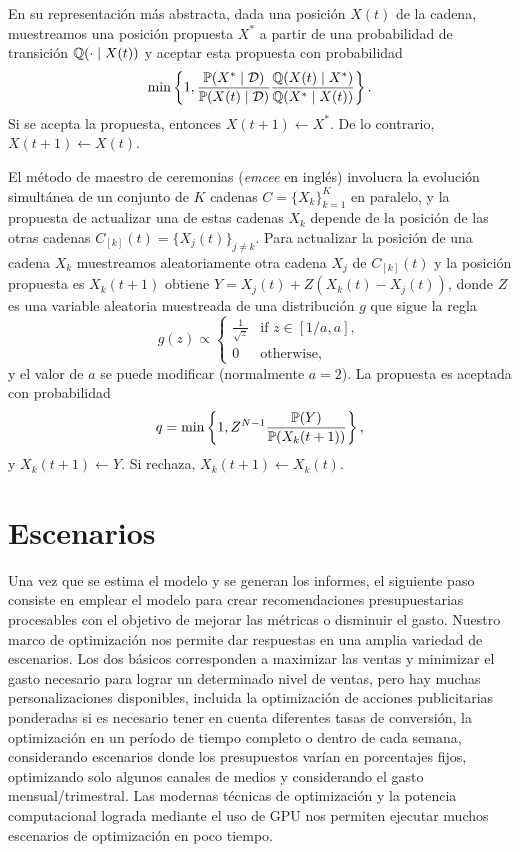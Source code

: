 En su representación más abstracta, dada una posición \(X(t)\) de la cadena, muestreamos una posición propuesta \(X^*\) a partir de una probabilidad de transición \(\mathbb{Q}(\cdot \mid X(t))\) y aceptar esta propuesta con probabilidad
\[ \min \left\{ 1, \frac{\mathbb{P}(X^* \mid \mathcal{D})}{\mathbb{P}(X(t) \mid \mathcal{D})} \frac{\mathbb{Q}(X(t) \mid X^* )}{\mathbb{Q}(X^* \mid X(t))} \right\}. \]
Si se acepta la propuesta, entonces \(X(t+1) \gets X^*\). De lo contrario, \(X(t+1) \gets X(t)\).

El método de maestro de ceremonias (\emph{emcee} en inglés) involucra la evolución simultánea de un conjunto de \(K\) cadenas \( C = \{X_k\}_{k=1}^K \) en paralelo, y la propuesta de actualizar una de estas cadenas \( X_k \) depende de la posición de las otras cadenas \( C_{[k]}(t) = \{X_j(t)\}_{j\neq k} \). Para actualizar la posición de una cadena \(X_k\) muestreamos aleatoriamente otra cadena \( X_j \) de \( C_{[k]}(t) \) y la posición propuesta es \( X_k(t + 1)\) obtiene \(Y = X_j(t) + Z ( X_k(t) - X_j(t) )\), donde \(Z\) es una variable aleatoria muestreada de una distribución \(g\) que sigue la regla
\[ g(z) \propto
\begin{cases}
\frac{1}{\sqrt{z}}	& \text{if } z \in [1/a, a],\\
0					& \text{otherwise,}
\end{cases}
\]
y el valor de \(a\) se puede modificar (normalmente \( a = 2 \)). La propuesta es aceptada con probabilidad
\[ q = \min \left\{ 1, Z^{N-1} \frac{ \mathbb{P}(Y) }{ \mathbb{P}(X_k(t+1)) } \right\}, \]
y \(X_k(t+1) \gets Y\). Si rechaza, \( X_k(t+1) \gets X_k(t) \).

\section{Escenarios}

Una vez que se estima el modelo y se generan los informes, el siguiente paso consiste en emplear el modelo para crear recomendaciones presupuestarias procesables con el objetivo de mejorar las métricas o disminuir el gasto. Nuestro marco de optimización nos permite dar respuestas en una amplia variedad de escenarios. Los dos básicos corresponden a maximizar las ventas y minimizar el gasto necesario para lograr un determinado nivel de ventas, pero hay muchas personalizaciones disponibles, incluida la optimización de acciones publicitarias ponderadas si es necesario tener en cuenta diferentes tasas de conversión, la optimización en un período de tiempo completo o dentro de cada semana, considerando escenarios donde los presupuestos varían en porcentajes fijos, optimizando solo algunos canales de medios y considerando el gasto mensual/trimestral. Las modernas técnicas de optimización y la potencia computacional lograda mediante el uso de GPU nos permiten ejecutar muchos escenarios de optimización en poco tiempo.

